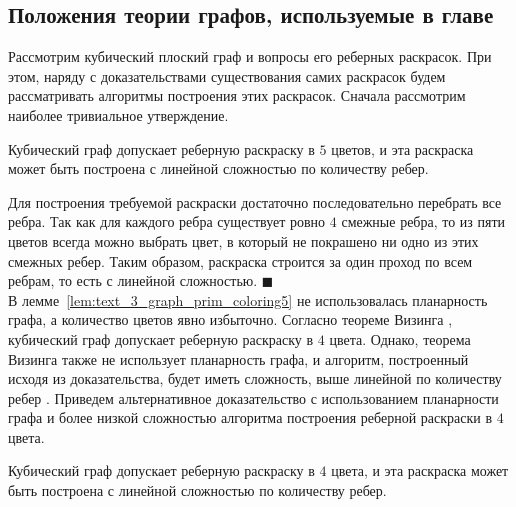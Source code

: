 \subsection{Положения теории графов, используемые в главе}\label{sec:text_3_graph_prim}

Рассмотрим кубический плоский граф\label{term:graph_cubic} и вопросы его реберных раскрасок.
При этом, наряду с доказательствами существования самих раскрасок будем рассматривать алгоритмы построения этих раскрасок.
Сначала рассмотрим наиболее тривиальное утверждение.


\begin{lemma}\label{lem:text_3_graph_prim_coloring5}
Кубический граф допускает реберную раскраску в $5$ цветов, и эта раскраска может быть построена с линейной сложностью по количеству ребер.
\end{lemma}
Для построения требуемой раскраски достаточно последовательно перебрать все ребра.
Так как для каждого ребра существует ровно $4$ смежные ребра, то из пяти цветов всегда можно выбрать цвет, в который не покрашено ни одно из этих смежных ребер.
Таким образом, раскраска строится за один проход по всем ребрам, то есть с линейной сложностью.
$\blacksquare$\\


В лемме~\ref{lem:text_3_graph_prim_coloring5} не использовалась планарность графа, а количество цветов явно избыточно.
Согласно теореме Визинга \cite{Vizing1964}, \cite{Vizing1965} кубический граф допускает реберную раскраску в $4$ цвета.
Однако, теорема Визинга также не использует планарность графа, и алгоритм, построенный исходя из доказательства, будет иметь сложность, выше линейной по количеству ребер \cite{Soifer2009}.
Приведем альтернативное доказательство с использованием планарности графа и более низкой сложностью алгоритма построения реберной раскраски в $4$ цвета.

\begin{lemma}\label{lem:text_3_graph_prim_coloring4}
Кубический граф допускает реберную раскраску в $4$ цвета, и эта раскраска может быть построена с линейной сложностью по количеству ребер.
\end{lemma}

